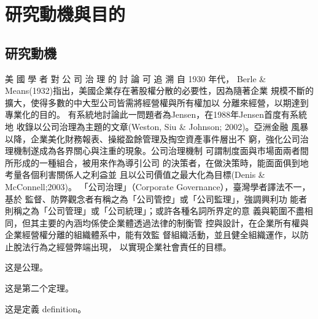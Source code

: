 \documentclass[
    writingLanguage=chinese,
    addPageTitle=on,
    addDeclaration=on,
    addMUSTlog=off,
    printing=off,
    refIndent=on,
    addFigTOC=on,
    addTabTOC=on,
]{.def/must}
\begin{document}
\section{研究動機與目的}
\citep{luey2013, turabian2015, WangZhenWu2004, WenZaoWai2009, QiuZiHeng2017, HeDingZhao2019, WuPeiHua2020, QiuJiongYou2014, QiuJiongYou2016, QiuJiongYou2019, LinDongTai2008, LinJing2018, LinWenYao2018, LinXHui2014, HongWenQi2019, HongZhenZhou2018, ChenYaNing9999, ChenXiaMin2019, ZhangYan2016, GuoJiaTu2019, WenDaMao2015, JianYiLing2019, bourdieu1990, cohen2007, harvey2007, manguel2009, šteger2010, Villazón2011, bordwell2013, cole2013, deliot2014, foster2017, paige2017, johnson2018, wipawin2018, poff2019, giles2019, TaiwanNews2019, abdoh2019, macdonald2020, Milliot2020, OrganisationforEconomicCo2020, rothfeld2020, crotty2020, melero2021}

\subsection{研究動機}
美 國 學 者 對 公 司 治 理 的 討 論 可 追 溯 自 1930 年代， Berle \&
Means(1932)指出，美國企業存在著股權分散的必要性，因為隨著企業
規模不斷的擴大，使得多數的中大型公司皆需將經營權與所有權加以
分離來經營，以期達到專業化的目的。
有系統地討論此一問題者為Jensen，在1988年Jensen首度有系統地
收錄以公司治理為主題的文章(Weston, Siu \& Johnson; 2002)。亞洲金融
風暴以降，企業美化財務報表、操縱盈餘管理及掏空資產事件層出不
窮，強化公司治理機制遂成為各界關心與注重的現象。公司治理機制
可謂制度面與市場面兩者間所形成的一種組合，被用來作為導引公司
的決策者，在做決策時，能面面俱到地考量各個利害關係人之利益並
且以公司價值之最大化為目標(Denis \& McConnell;2003)。
「公司治理」（Corporate Governance），臺灣學者譯法不一，基於
監督、防弊觀念者有稱之為「公司管控」或「公司監理」，強調興利功
能者則稱之為「公司管理」或「公司統理」；或許各種名詞所界定的意
義與範圍不盡相同，但其主要的內涵均係使企業體透過法律的制衡管
控與設計，在企業所有權與企業經營權分離的組織體系中，能有效監
督組織活動，並且健全組織運作，以防止脫法行為之經營弊端出現，
以實現企業社會責任的目標。
\txtHere[1]

\begin{axiom}
这是公理。
\end{axiom}


\begin{theorem}
这是第二个定理。
\end{theorem}



\begin{definition}
这是定義 definition。
\end{definition}
\end{document}
